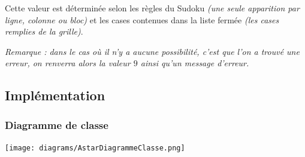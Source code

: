 Cette valeur est déterminée selon les règles du Sudoku \textit{(une seule apparition par ligne, colonne ou bloc)} et les cases contenues dans la liste fermée \textit{(les cases remplies de la grille)}.

\textit{Remarque : dans le cas où il n'y a aucune possibilité, c'est que l'on a trouvé une erreur, on renverra alors la valeur $9$ ainsi qu'un message d'erreur.}




\subsection{Implémentation}

\subsubsection{Diagramme de classe}

\texttt{[image: diagrams/AstarDiagrammeClasse.png]}

\bigskip


